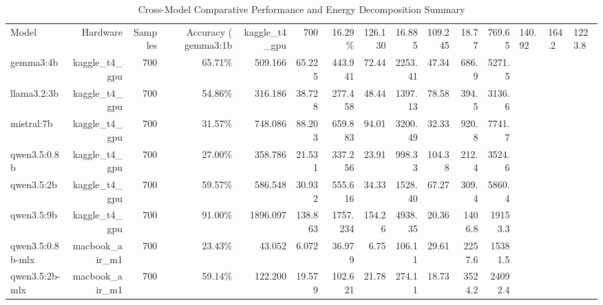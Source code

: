 \begin{table}[t]
\centering
\small
\begin{tabular}{lrrrrrrrrrrr}
\toprule
Model & Hardware & Samples & Accuracy (%
\midrule
gemma3:1b & kaggle\_t4\_gpu & 700 & 16.29\% & 126.130 & 16.885 & 109.245 & 18.77 & 769.65 & 140.92 & 164.2 & 1223.8 \\
gemma3:4b & kaggle\_t4\_gpu & 700 & 65.71\% & 509.166 & 65.225 & 443.941 & 72.44 & 2253.41 & 47.34 & 686.9 & 5271.5 \\
llama3.2:3b & kaggle\_t4\_gpu & 700 & 54.86\% & 316.186 & 38.728 & 277.458 & 48.44 & 1397.13 & 78.58 & 394.5 & 3136.6 \\
mistral:7b & kaggle\_t4\_gpu & 700 & 31.57\% & 748.086 & 88.203 & 659.883 & 94.01 & 3200.49 & 32.33 & 920.8 & 7741.7 \\
qwen3.5:0.8b & kaggle\_t4\_gpu & 700 & 27.00\% & 358.786 & 21.531 & 337.256 & 23.91 & 998.33 & 104.38 & 212.4 & 3524.6 \\
qwen3.5:2b & kaggle\_t4\_gpu & 700 & 59.57\% & 586.548 & 30.932 & 555.616 & 34.33 & 1528.40 & 67.27 & 309.4 & 5860.4 \\
qwen3.5:9b & kaggle\_t4\_gpu & 700 & 91.00\% & 1896.097 & 138.863 & 1757.234 & 154.26 & 4938.35 & 20.36 & 1406.8 & 19153.3 \\
qwen3.5:0.8b-mlx & macbook\_air\_m1 & 700 & 23.43\% & 43.052 & 6.072 & 36.979 & 6.75 & 106.11 & 29.61 & 2257.6 & 15381.5 \\
qwen3.5:2b-mlx & macbook\_air\_m1 & 700 & 59.14\% & 122.200 & 19.579 & 102.621 & 21.78 & 274.11 & 18.73 & 3524.2 & 24092.4 \\
\bottomrule
\end{tabular}
\caption{Cross-Model Comparative Performance and Energy Decomposition Summary}
\label{tab:1_model_comparison}
\end{table}
